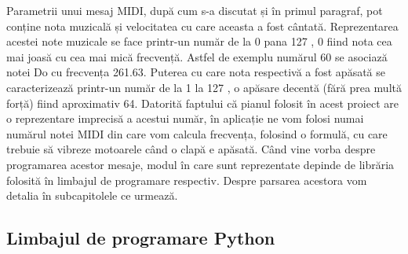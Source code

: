 \documentclass[../IoMusT.tex]{subfiles}
\begin{document}
\par Parametrii unui mesaj MIDI, după cum s-a discutat și în primul paragraf, pot conține nota muzicală și velocitatea cu care aceasta a fost cântată. Reprezentarea acestei note muzicale se face printr-un număr de la 0 pana 127 \cite{MidiSoftware}, 0 fiind nota cea mai joasă cu cea mai mică frecvență. Astfel de exemplu numărul 60 se asociază notei Do cu frecvența 261.63. Puterea cu care nota respectivă a fost apăsată se caracterizează printr-un număr de la 1 la 127 \cite{MidiSoftware}, o apăsare decentă (fără prea multă forță) fiind aproximativ 64. Datorită faptului că pianul folosit în acest proiect are o reprezentare imprecisă a acestui număr, în aplicație ne vom folosi numai numărul notei MIDI din care vom calcula frecvența, folosind o formulă, cu care trebuie să vibreze motoarele când o clapă e apăsată. Când vine vorba despre programarea acestor mesaje, modul în care sunt reprezentate depinde de librăria folosită în limbajul de programare respectiv. Despre parsarea acestora vom detalia în subcapitolele ce urmează.

\subsection{Limbajul de programare Python}
\end{document}
